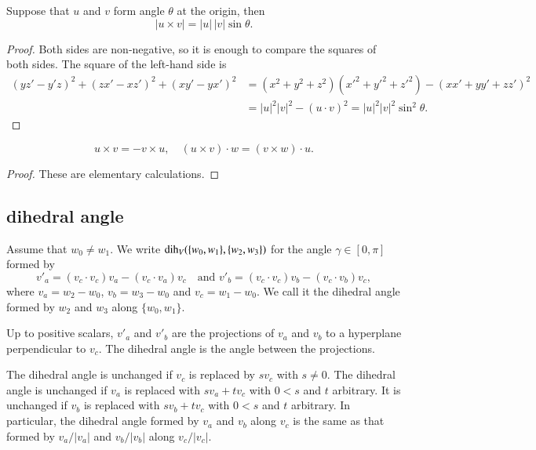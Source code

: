 \begin{lemma}  
Suppose that $u$ and $v$ form angle $\theta$ at the origin, then
    $$|u \times v| = |u|\,|v|\sin\theta.$$
\end{lemma}

\begin{proof}
   Both sides are non-negative, so it is enough to compare the
   squares of both sides.  The square of the left-hand side is
   $$
   \begin{array}{lll}
   (y z'- y'z)^2 + (z x' - x z')^2 + (x y' - y x')^2 &=
   (x^2 + y^2 + z^2)(x'^2 + y'^2 + z'^2) - (x x' + y y' + z z')^2
   \\&= |u|^2|v|^2 - (u\cdot v)^2 = |u|^2|v|^2 \sin^2\theta.
   \end{array}
   $$
\end{proof}


\begin{lemma} 
    $$
    u\times v = -v\times u,\quad
    (u\times v)\cdot w = (v\times w)\cdot u.
    $$
\end{lemma}

\begin{proof} These are elementary calculations.
\end{proof}



\subsection{dihedral angle}


\begin{definition} Assume that $w_0\ne w_1$.
We write $\operatorname{dih}_V(\{w_0,w_1\},\{w_2,w_3\})$ for the angle $\gamma\in[0,\pi]$
formed
by 
    $$
    v'_a = (v_c\cdot v_c) v_a - (v_c\cdot v_a) v_c\quad\text{and }v'_b =
            (v_c\cdot v_c) v_b - (v_c\cdot v_b) v_c,
    $$
where $v_a = w_2-w_0$, $v_b=w_3-w_0$ and $v_c=w_1-w_0$.  We call it
the dihedral angle formed by $w_2$ and $w_3$ along $\{w_0,w_1\}$.
\end{definition}

Up to positive scalars, $v'_a$ and $v'_b$ are the projections of
$v_a$ and $v_b$ to a hyperplane perpendicular to $v_c$.  The
dihedral angle is the angle between the projections.

The dihedral angle is unchanged if $v_c$ is replaced by $s v_c$ with
$s\ne0$. The dihedral angle is unchanged if $v_a$ is replaced with
$s v_a + t v_c$ with $0 < s$ and $t$ arbitrary.  It is unchanged if
$v_b$ is replaced with $s v_b + t v_c$ with $0 < s$ and $t$
arbitrary.  In particular, the dihedral angle formed by $v_a$ and
$v_b$ along $v_c$ is the same as that formed by $v_a/|v_a|$ and
$v_b/|v_b|$ along $v_c/|v_c|$.


